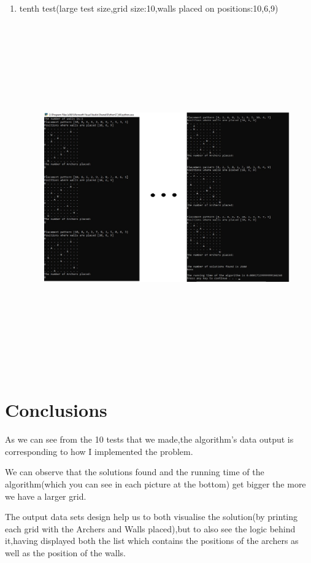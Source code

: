 \documentclass{article}
\begin{document}
\begin{enumerate}
\newpage
\item tenth test(large test size,grid size:10,walls placed on positions:10,6,9)
\begin{figure}[h]
\includegraphics[width=12 cm, height=15cm]{test10}
\end{figure}

\end{enumerate}
\newpage
\section{Conclusions}
\LARGE
\par As we can see from the 10 tests that we made,the algorithm's data output is corresponding to how I implemented the problem.
\par We can observe that the solutions found and the running time of the algorithm(which you can  see in each picture at the bottom) get bigger the more we have a larger grid.
\par The output data sets design help us to both visualise the solution(by printing each grid with the Archers and Walls placed),but to also see the logic behind it,having displayed both the list which contains the positions of the archers as well as the position of the walls.
\end{document}
